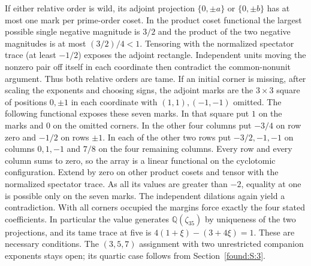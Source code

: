 \documentclass[11pt,a4paper]{article}
\numberwithin{equation}{section}
\theoremstyle{remark}
\newcommand{\QQ}{\mathbb Q}
\begin{document}
If either relative order is wild, its adjoint projection
$\{0,\pm a\}$ or $\{0,\pm b\}$ has at most one mark per prime-order
coset. In the product coset functional the largest possible single
negative magnitude is $3/2$ and the product of the two negative
magnitudes is at most $(3/2)/4<1$. Tensoring with the normalized
spectator trace (at least $-1/2$) exposes the adjoint rectangle.
Independent units moving the nonzero pair off itself in each
coordinate then contradict the common-nonunit argument. Thus both
relative orders are tame. If an initial corner is missing, after
scaling the exponents and choosing signs, the adjoint marks are the
$3\times3$ square of positions $0,\pm1$ in each coordinate with
$(1,1),(-1,-1)$ omitted. The following functional exposes these
seven marks. In that square put $1$ on the marks and $0$ on the
omitted corners. In the other four columns put $-3/4$ on row zero
and $-1/2$ on rows $\pm1$. In each of the other two rows put
$-3/2,-1,-1$ on columns $0,1,-1$ and $7/8$ on the four remaining
columns. Every row and every column sums to zero, so the array is a
linear functional on the cyclotomic configuration. Extend by zero
on other product cosets and tensor with the normalized spectator
trace. As all its values are greater than $-2$, equality at one
is possible only on the seven marks. The independent dilations
again yield a contradiction. With all corners occupied the margins
force exactly the four stated coefficients. In particular the value
generates $\QQ(\zeta_{35})$ by uniqueness of the two projections, and
its tame trace at five is $4(1+\xi)-(3+4\xi)=1$. These are necessary
conditions. The $(3,5,7)$ assignment with two unrestricted companion
exponents stays open; its quartic case follows from Section~\ref{found:S:3}.
\end{document}
